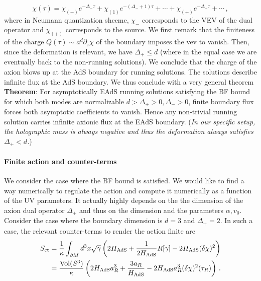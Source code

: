 \documentclass[a4paper]{article}
\begin{document}
\begin{equation}
  \chi(\tau) = \chi_{(-)} e^{-\Delta_- \tau} + \chi_{(1)}e^{-\left(\Delta_- + 1\right)\tau} + \cdots + \chi_{(+)} e^{-\Delta_+ \tau} + \cdots\,,
\end{equation}
where in Neumann quantization shceme, $\chi_-$ corresponds to the VEV of the dual operator and $\chi_{(+)}$ corresponds to the source. We first remark that the finiteness of the charge $Q(\tau)\sim a^d \partial_\tau \chi$ of the boundary imposes the vev to vanish. Then, since the deformation is relevant, we have $\Delta_+ \leq d$ (where in the equal case we are eventually back to the non-running solutions). We conclude that the charge of the axion blows up at the AdS boundary for running solutions. The solutions describe infinite flux at the AdS boundary. We thus conclude with a very general theorem\\
\textbf{Theorem}: For asymptotically EAdS running solutions satisfying the BF bound for which both modes are normalizable $d>\Delta_+>0,\Delta_->0$, finite boundary flux forces both asymptotic coefficients to vanish. Hence any non-trivial running solution carries infinite axionic flux at the EAdS boundary.
(\textit{In our specific setup, the holographic mass is always negative and thus the deformation always satisfies $\Delta_+<d$.})
\paragraph{Finite action and counter-terms}
We consider the case where the BF bound is satisfied. We would like to find a way numerically to regulate the action and compute it numerically as a function of the UV parameters. It actually highly depends on the the dimension of the axion dual operator $\Delta_+$ and thus on the dimension and the parameters $\alpha,v_0$. Consider the case where the boundary dimension is $d=3$ and $\Delta_+=2$. In such a case, the relevant counter-terms to render the action finite are
\begin{equation}
  \begin{aligned}
S_{\rm ct}
&=
\frac{1}{\kappa}
\int_{\partial M} d^3x\sqrt{\gamma}
\left(
2H_{\rm AdS}
+
\frac{1}{2H_{\rm AdS}}R[\gamma]
- 2 H_{\rm AdS}(\delta\chi)^2
\right)\\
&=
\frac{{\rm Vol}(S^3)}{\kappa}
\left(
2H_{\rm AdS}a_R^3+\frac{3a_R}{H_{\rm AdS}} - 2 H_{\rm AdS}a_R^3(\delta\chi)^2(\tau_R)
\right)\,.
\end{aligned}
\end{equation}



\end{document}
